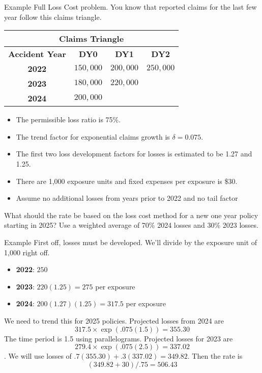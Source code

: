 \documentclass[compress,mathserif]{beamer}
\begin{document}
\begin{frame}{Example}
\small
Full Loss Cost problem. You know that reported claims for the last few year follow this claims triangle. 
\begin{table}[htbp]
    \centering
    \begin{tabular}{|c|c|c|c|}
    \hline
    \multicolumn{4}{|c|}{\textbf{Claims Triangle}} \\ \hline
    \textbf{Accident Year} & \textbf{DY0} & \textbf{DY1} & \textbf{DY2} \\ \hline
    \textbf{2022} & $150,000$ & $200,000$ & $250,000$ \\ \hline
    \textbf{2023} & $180,000$ & $220,000$ &  \\ \hline
    \textbf{2024} & $200,000$ & &  \\ \hline
    \end{tabular}
\end{table}
\small
\begin{itemize}
\item The permissible loss ratio is 75\%. 
\item The trend factor for exponential claims growth is $\delta = 0.075$. 
\item The first two loss development factors for losses is estimated to be 1.27 and 1.25.
\item There are 1,000 exposure units and fixed expenses per exposure is \$30. 
\item Assume no additional losses from years prior to 2022 and no tail factor
\end{itemize}
What should the rate be based on the loss cost method for a new one year policy starting in 2025? Use a weighted average of 70\% 2024 losses and 30\% 2023 losses. 

\end{frame}

\begin{frame}{Example}
First off, losses must be developed. We'll divide by the exposure unit of 1,000 right off. 
\begin{itemize}
\item \textbf{2022}: $250$
\item \textbf{2023}: $220(1.25) = 275$ per exposure
\item \textbf{2024}: $200 (1.27)(1.25) = 317.5$ per exposure
\end{itemize} 
We need to trend this for 2025 policies. Projected losses from 2024 are \[317.5 \times \exp{(.075 (1.5))} = 355.30\] The time period is 1.5 using parallelograms. Projected losses for 2023 are  \[279.4 \times \exp{(.075 (2.5))} = 337.02\]. We will use losses of $.7(355.30) + .3(337.02) = 349.82$. Then the rate is \[(349.82+30)/.75 = 506.43\]
\end{frame}
\end{document}
